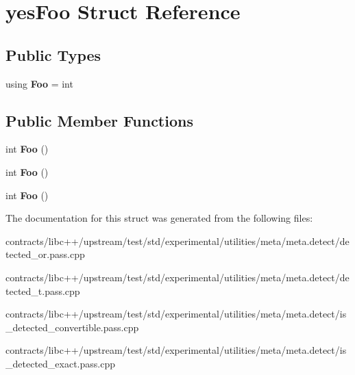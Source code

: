 \hypertarget{structyes_foo}{}\section{yes\+Foo Struct Reference}
\label{structyes_foo}
\subsection*{Public Types}
\begin{DoxyCompactItemize}
\item 
\mbox{\label{structyes_foo_a4e80153fcda19a024db1409bd0cae0c2}} 
using {\bfseries Foo} = int
\end{DoxyCompactItemize}
\subsection*{Public Member Functions}
\begin{DoxyCompactItemize}
\item 
\mbox{\label{structyes_foo_a10fe260721bac2ca52a48b34041ef382}} 
int {\bfseries Foo} ()
\item 
\mbox{\label{structyes_foo_a10fe260721bac2ca52a48b34041ef382}} 
int {\bfseries Foo} ()
\item 
\mbox{\label{structyes_foo_a10fe260721bac2ca52a48b34041ef382}} 
int {\bfseries Foo} ()
\end{DoxyCompactItemize}


The documentation for this struct was generated from the following files\+:\begin{DoxyCompactItemize}
\item 
contracts/libc++/upstream/test/std/experimental/utilities/meta/meta.\+detect/detected\+\_\+or.\+pass.\+cpp\item 
contracts/libc++/upstream/test/std/experimental/utilities/meta/meta.\+detect/detected\+\_\+t.\+pass.\+cpp\item 
contracts/libc++/upstream/test/std/experimental/utilities/meta/meta.\+detect/is\+\_\+detected\+\_\+convertible.\+pass.\+cpp\item 
contracts/libc++/upstream/test/std/experimental/utilities/meta/meta.\+detect/is\+\_\+detected\+\_\+exact.\+pass.\+cpp\end{DoxyCompactItemize}

